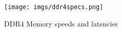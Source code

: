 

            


\begin{figure}%
  \centering
  \texttt{[image: imgs/ddr4specs.png]}
  \caption{DDR4 Memory speeds and latencies}%
  \label{fig:ddr4specs}%
\end{figure}

